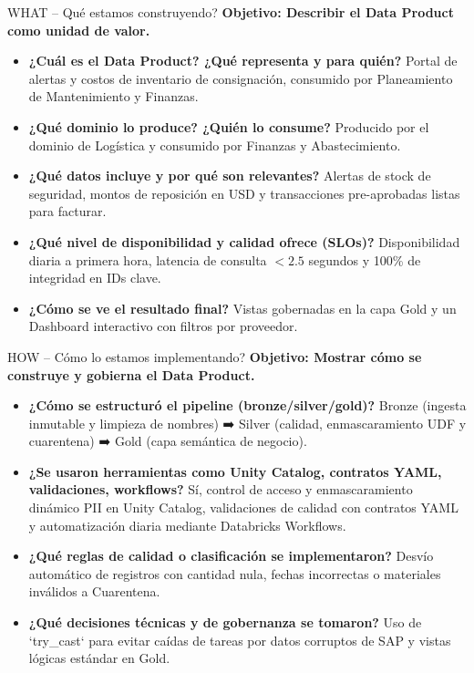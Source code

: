 \documentclass[aspectratio=169,10pt]{beamer}
\begin{document}
\begin{frame}{WHAT -- Qué estamos construyendo?}
    \textbf{Objetivo: Describir el Data Product como unidad de valor.}
    \vspace{0.4cm}
    \begin{itemize}
        \item \textbf{¿Cuál es el Data Product? ¿Qué representa y para quién?}
          Portal de alertas y costos de inventario de consignación, consumido por Planeamiento de Mantenimiento y Finanzas.
        \item \textbf{¿Qué dominio lo produce? ¿Quién lo consume?}
          Producido por el dominio de Logística y consumido por Finanzas y Abastecimiento.
        \item \textbf{¿Qué datos incluye y por qué son relevantes?}
          Alertas de stock de seguridad, montos de reposición en USD y transacciones pre-aprobadas listas para facturar.
        \item \textbf{¿Qué nivel de disponibilidad y calidad ofrece (SLOs)?}
          Disponibilidad diaria a primera hora, latencia de consulta $<2.5$ segundos y 100\% de integridad en IDs clave.
        \item \textbf{¿Cómo se ve el resultado final?}
          Vistas gobernadas en la capa Gold y un Dashboard interactivo con filtros por proveedor.
    \end{itemize}
\end{frame}

\begin{frame}{HOW -- Cómo lo estamos implementando?}
    \textbf{Objetivo: Mostrar cómo se construye y gobierna el Data Product.}
    \vspace{0.4cm}
    \begin{itemize}
        \item \textbf{¿Cómo se estructuró el pipeline (bronze/silver/gold)?}
          Bronze (ingesta inmutable y limpieza de nombres) ➡️ Silver (calidad, enmascaramiento UDF y cuarentena) ➡️ Gold (capa semántica de negocio).
        \item \textbf{¿Se usaron herramientas como Unity Catalog, contratos YAML, validaciones, workflows?}
          Sí, control de acceso y enmascaramiento dinámico PII en Unity Catalog, validaciones de calidad con contratos YAML y automatización diaria mediante Databricks Workflows.
        \item \textbf{¿Qué reglas de calidad o clasificación se implementaron?}
          Desvío automático de registros con cantidad nula, fechas incorrectas o materiales inválidos a Cuarentena.
        \item \textbf{¿Qué decisiones técnicas y de gobernanza se tomaron?}
          Uso de `try_cast` para evitar caídas de tareas por datos corruptos de SAP y vistas lógicas estándar en Gold.
    \end{itemize}
\end{frame}
\end{document}
